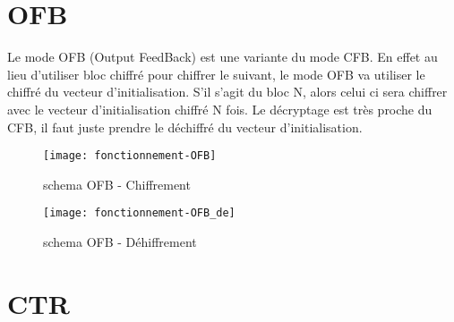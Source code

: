 \section{OFB}
Le mode OFB (Output FeedBack) est une variante du mode CFB. En effet au lieu d'utiliser bloc chiffré pour chiffrer le suivant, le mode OFB va utiliser le chiffré du vecteur d'initialisation. S'il s'agit du bloc N, alors celui ci sera chiffrer avec le vecteur d'initialisation chiffré N fois. Le décryptage est très proche du CFB, il faut juste prendre le déchiffré du vecteur d'initialisation.


\begin{figure}[!h]
  \centering
  \texttt{[image: fonctionnement-OFB]}
  \caption{schema OFB - Chiffrement}
  \label{schema OFB - Chiffrement}
\end{figure}

\begin{figure}[!h]
  \centering
  \texttt{[image: fonctionnement-OFB\_de]}
  \caption{schema OFB - Déhiffrement}
  \label{schema OFB - Déchiffrement}
\end{figure}

\section{CTR}





